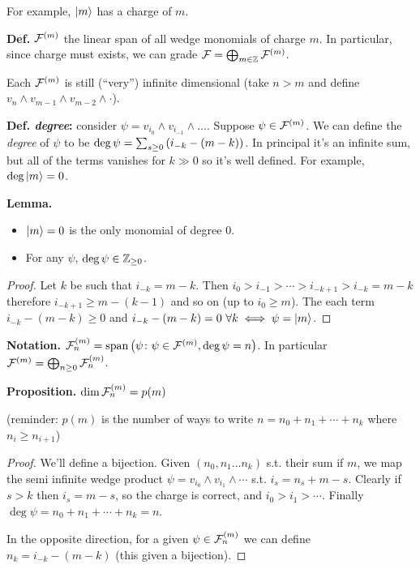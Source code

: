 \documentclass[]{../../../../tex/classes/styledArticle}
\begin{document}
	For example, $|m\rangle $ has a charge of $m$. 
	
	\textbf{Def. }$\mathcal{F}^{(m)}$ the linear span of all wedge monomials of charge $m$. In particular, since charge must exists, we can grade $\mathcal{F} = \bigoplus_{m \in \mathbb{Z}} \mathcal{F}^{(m)}$. 
	
	Each $\mathcal{F}^{(m)}$ is still (``very'') infinite dimensional (take $n > m$ and define $v_n \land v_{m - 1} \land v_{m - 2} \land \cdot$). 
	
	\textbf{Def. \textit{degree}: }consider $\psi = v_{i_0} \land v_{i_{-1}} \land \dots$. Suppose $\psi \in \mathcal{F}^{(m)}$. We can define the \textit{degree} of $\psi$ to be $\deg \psi = \sum_{s \ge 0}\left ( i_{-k} - (m - k) \right )$. In principal it's an infinite sum, but all of the terms vanishes for $k \gg 0$ so it's well defined. For example, $\deg |m\rangle = 0$. 
	
	\textbf{Lemma. }
	\begin{itemize}
		\item $|m \rangle = 0$ is the only monomial of degree 0. 
		\item For any $\psi$, $\deg \psi \in \mathbb{Z}_{\ge 0}$. 
	\end{itemize}\begin{proof}
		Let $k$ be such that $i_{-k} = m - k$. Then $i_0 > i_{-1} > \cdots > i_{-k + 1} > i_{-k} = m - k$ therefore $i_{-k + 1} \ge m- (k - 1)$ and so on (up to $i_0 \ge m$). The each term $i_{-k} - (m - k) \ge 0$ and $i_{-k} - (m - k) = 0 \ \forall k \iff \psi = |m\rangle$. 
	\end{proof}
	
	\textbf{Notation. }$\mathcal{F}^{(m)}_n = \operatorname{span}\left ( \psi \colon \psi \in \mathcal{F}^{(m)}, \deg \psi = n \right )$. 
	In particular $\mathcal{F}^{(m)} = \bigoplus_{n \ge 0}\mathcal{F}^{(m)}_n$. 
	
	\textbf{Proposition. }$\dim \mathcal{F}^{(m)}_n = p(m)$
	
	(reminder: $p(m)$ is the number of ways to write $n = n_0 + n_1 + \cdots + n_k$ where $n_i \ge n_{i + 1}$)
	
	\begin{proof}
		We'll define a bijection. Given $(n_0, n_1 \dots n_k)$ s.t. their sum if $m$, we map the semi infinite wedge product $\psi = v_{i_0} \land v_{i_1} \land \cdots$ s.t. $i_s = n_s + m - s$. Clearly if $s > k$ then $i_s = m - s$, so the charge is correct, and $i_0 > i_1 > \cdots$. Finally $\deg \psi = n_0 + n_1 + \cdots + n_k = n$. 
		
		In the opposite direction, for a given $\psi \in \mathcal{F}^{(m)}_n$ we can define $n_k = i_{-k} - (m - k)$ (this given a bijection). 
	\end{proof}
	
\end{document}
